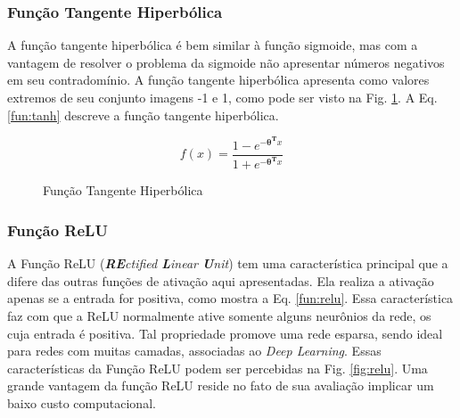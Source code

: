 \subsubsection{Função Tangente Hiperbólica}
\label{subsec:htan}

A função tangente hiperbólica é bem similar à função sigmoide, mas com a vantagem de resolver o problema da sigmoide não apresentar números negativos em seu contradomínio. A função tangente hiperbólica apresenta como valores extremos de seu conjunto imagens -1 e 1, como pode ser visto na Fig. \ref{fg:funcao_tanh}. A Eq. \eqref{fun:tanh} descreve a função tangente hiperbólica.

\begin{equation}
  f(x) =  \frac{\mathrm{1} - e^{- \mathbf{\theta^T}x}}{\mathrm{1} + e^{- \mathbf{\theta^T}x}}
  \label{fun:tanh}
\end{equation}

\begin{center}
    \begin{figure}
    \caption{Função Tangente Hiperbólica}
        \centering
    \label{fg:funcao_tanh}
	\end{figure}
\end{center}


\subsubsection{Função ReLU}
\label{subsec:relu}
A Função ReLU (\textit{\textbf{RE}ctified \textbf{L}inear \textbf{U}nit}) tem uma característica principal que a difere das outras funções de ativação aqui apresentadas. Ela realiza a ativação apenas se a entrada for positiva, como mostra a Eq. \ref{fun:relu}. Essa característica faz com que a ReLU normalmente ative somente alguns neurônios da rede, os cuja entrada é positiva. Tal propriedade promove uma rede esparsa, sendo ideal para redes com muitas camadas, associadas ao \textit{Deep Learning}. Essas características da Função ReLU podem ser percebidas na Fig. \ref{fig:relu}. Uma grande vantagem da função ReLU reside no fato de sua avaliação implicar um baixo custo computacional.

